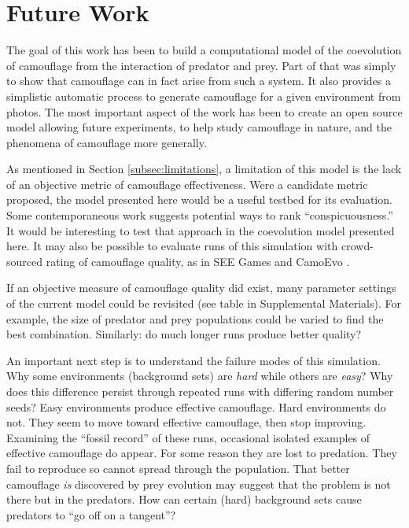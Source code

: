 \documentclass[acmtog]{acmart}
\begin{document}
\section{Future Work}
The goal of this work has been to build a computational model of the coevolution of camouflage from the interaction of predator and prey. Part of that was simply to show that camouflage can in fact arise from such a system. It also provides a simplistic automatic process to generate camouflage for a given environment from photos. The most important aspect of the work has been to create an open source model allowing future experiments, to help study camouflage in nature, and the phenomena of camouflage more generally.
\par
As mentioned in Section \ref{subsec:limitations}, a limitation of this model is the lack of an objective metric of camouflage effectiveness. Were a candidate metric proposed, the model presented here would be a useful testbed for its evaluation. Some contemporaneous work \cite{lv_cod_2022} suggests potential ways to rank “conspicuousness.” It would be interesting to test that approach in the coevolution model presented here. It may also be possible to evaluate runs of this simulation with crowd-sourced rating of camouflage quality, as in SEE Games \cite{stevens_games_2022} and CamoEvo \cite{hancock_camoevo_2022}.
\par
If an objective measure of camouflage quality did exist, many parameter settings of the current model could be revisited (see table in Supplemental Materials). For example, the size of predator and prey populations could be varied to find the best combination. Similarly: do much longer runs produce better quality?
\par
An important next step is to understand the failure modes of this simulation. Why some environments (background sets) are \textit{hard} while others are \textit{easy}? Why does this difference persist through repeated runs with differing random number seeds?
Easy environments produce effective camouflage. Hard environments do not. They seem to move toward effective camouflage, then stop improving. Examining the “fossil record” of these runs, occasional isolated examples of effective camouflage do appear. For some reason they are lost to predation. They fail to reproduce so cannot spread through the population. That better camouflage \textit{is} discovered by prey evolution may suggest that the problem is not there but in the predators. How can certain (hard) background sets cause predators to “go off on a tangent”?
\end{document}
